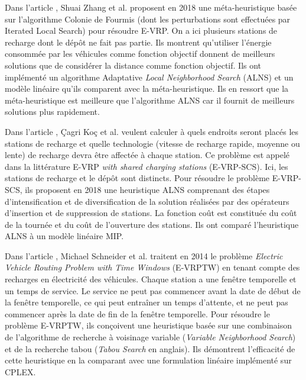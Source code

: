 Dans l'article \cite{article_GVRP1}, Shuai Zhang et al. proposent en 2018 une méta-heuristique basée sur l'algorithme Colonie de Fourmis (dont les perturbations sont effectuées par Iterated Local Search) pour résoudre E-VRP. On a ici plusieurs stations de recharge dont le dépôt ne fait pas partie. Ils montrent qu'utiliser l'énergie consommée par les véhicules comme fonction objectif donnent de meilleurs solutions que de considérer la distance comme fonction objectif. Ils ont implémenté un algorithme Adaptative \textit{Local Neighborhood Search} (ALNS) et un modèle linéaire qu'ils comparent avec la méta-heuristique. Ils en ressort que la méta-heuristique est meilleure que l'algorithme ALNS car il fournit de meilleurs solutions plus rapidement. 


Dans l'article \cite{article_GVRP3}, Çagri Koç et al. veulent calculer à quels endroits seront placés les stations de recharge et quelle technologie (vitesse de recharge rapide, moyenne ou lente) de recharge devra être affectée à chaque station. Ce problème est appelé dans la littérature E-VRP \textit{with shared charging stations} (E-VRP-SCS). Ici, les stations de recharge et le dépôt sont distincts. Pour résoudre le problème E-VRP-SCS, ils proposent en 2018 une heuristique ALNS comprenant des étapes d'intensification et de diversification de la solution réalisées par des opérateurs d'insertion et de suppression de stations. La fonction coût est constituée du coût de la tournée et du coût de l'ouverture des stations. Ils ont comparé l'heuristique ALNS à un modèle linéaire MIP.

Dans l'article \cite{article_RVRP1}, Michael Schneider et al. traitent en 2014 le problème \textit{Electric Vehicle Routing Problem with Time Windows} (E-VRPTW) en tenant compte des recharges en électricité des véhicules. Chaque station a une fenêtre temporelle et un temps de service. Le service ne peut pas commencer avant la date de début de la fenêtre temporelle, ce qui peut entraîner un temps d'attente, et ne peut pas commencer après la date de fin de la fenêtre temporelle. Pour résoudre le problème E-VRPTW, ils conçoivent une heuristique basée sur une combinaison de l'algorithme de recherche à voisinage variable (\textit{Variable Neighborhood Search}) et de la recherche tabou (\textit{Tabou Search} en anglais). Ils démontrent l'efficacité de cette heuristique en la comparant avec une formulation linéaire implémenté sur CPLEX. 

